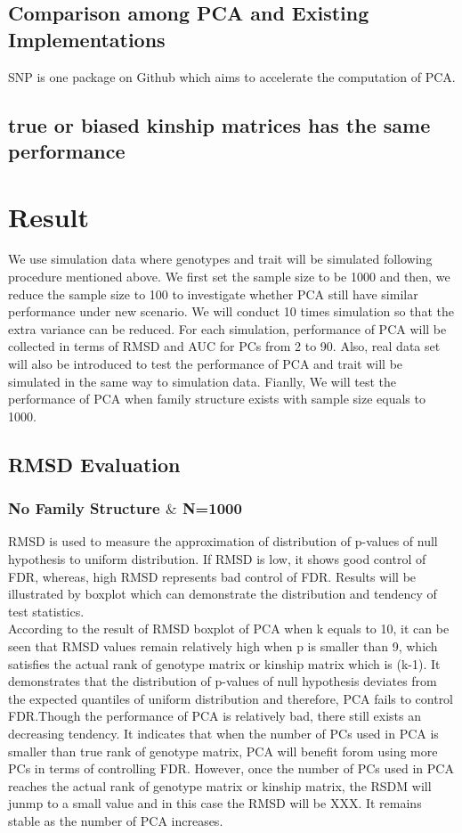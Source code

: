 \documentclass[12pt]{article}
\theoremstyle{definition}
\theoremstyle{plain}
\begin{document}
\subsection{Comparison among PCA and Existing Implementations }
SNP is one package on Github which aims to accelerate the computation of PCA.

\subsection{true or biased kinship matrices has the same performance}



\section{Result}

We use simulation data where genotypes and trait will be simulated following procedure mentioned above. We first set the sample size to be 1000 and then, we reduce the sample size to 100 to investigate whether PCA still have similar performance under new scenario. We will conduct 10 times simulation so that the extra variance can be reduced. For each simulation, performance of PCA will be collected in terms of RMSD and AUC for PCs from 2 to 90. Also, real data set will also be introduced to test the performance of PCA and trait will be simulated in the same way to simulation data. Fianlly, We will test the performance of PCA when family structure exists with sample size equals to 1000.
\subsection{RMSD Evaluation}
\subsubsection{No Family Structure $\&$ N=1000}
RMSD is used to measure the approximation of distribution of p-values of null hypothesis to uniform distribution. If RMSD is low, it shows good control of FDR, whereas, high RMSD represents bad control of FDR. Results will be illustrated by boxplot which can demonstrate the distribution and tendency of test statistics. \\
According to the result of RMSD boxplot of PCA when k equals to 10, it can be seen that RMSD values remain relatively high when p is smaller than 9, which satisfies the actual rank of genotype matrix or kinship matrix which is (k-1). It demonstrates that the distribution of p-values of null hypothesis deviates from the expected quantiles of uniform distribution and therefore, PCA fails to control FDR.Though the performance of PCA is relatively bad, there still exists an decreasing tendency. It indicates that when the number of PCs used in PCA is smaller than true rank of genotype matrix, PCA will benefit forom using more PCs in terms of controlling FDR. However, once the number of PCs used in PCA reaches the actual rank of genotype matrix or kinship matrix, the RSDM will junmp to a small value and in this case the RMSD will be XXX. It remains stable as the number of PCA increases. 
\end{document}
